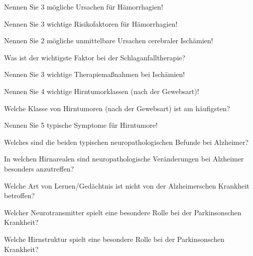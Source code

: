 \documentclass[10pt, a4paper]{exam}
\begin{document}
\begin{questions}
\begin{solution}
  \end{solution}
  \question Nennen Sie 3 mögliche Ursachen für Hämorrhagien!
  \begin{solution}
  \end{solution}
  \question Nennen Sie 3 wichtige Risikofaktoren für Hämorrhagien!
  \begin{solution}
  \end{solution}
  \question Nennen Sie 2 mögliche unmittelbare Ursachen cerebraler Ischämien!
  \begin{solution}
  \end{solution}
  \question Was ist der wichtigste Faktor bei der Schlaganfalltherapie?
  \begin{solution}
  \end{solution}
  \question Nennen Sie 3 wichtige Therapiemaßnahmen bei Ischämien!
  \begin{solution}
  \end{solution}
  \question Nennen Sie 4 wichtige Hirntumorklassen (nach der Gewebsart)!
  \begin{solution}
  \end{solution}
  \question Welche Klasse von Hirntumoren (nach der Gewebsart) ist am häufigsten?
  \begin{solution}
  \end{solution}
  \question Nennen Sie 5 typische Symptome für Hirntumore!
  \begin{solution}
  \end{solution}
  \question Welches sind die beiden typischen neuropathologischen Befunde bei Alzheimer?
  \begin{solution}
  \end{solution}
  \question In welchen Hirnarealen sind neuropathologische Veränderungen bei Alzheimer besonders anzutreffen?
  \begin{solution}
  \end{solution}
  \question Welche Art von Lernen/Gedächtnis ist nicht von der Alzheimerschen Krankheit betroffen?
  \begin{solution}
  \end{solution}
  \question Welcher Neurotransmitter spielt eine besondere Rolle bei der Parkinsonschen Krankheit?
  \begin{solution}
  \end{solution}
  \question Welche Hirnstruktur spielt eine besondere Rolle bei der Parkinsonschen Krankheit?
  \begin{solution}
  \end{solution}

\end{questions}
\end{document}
